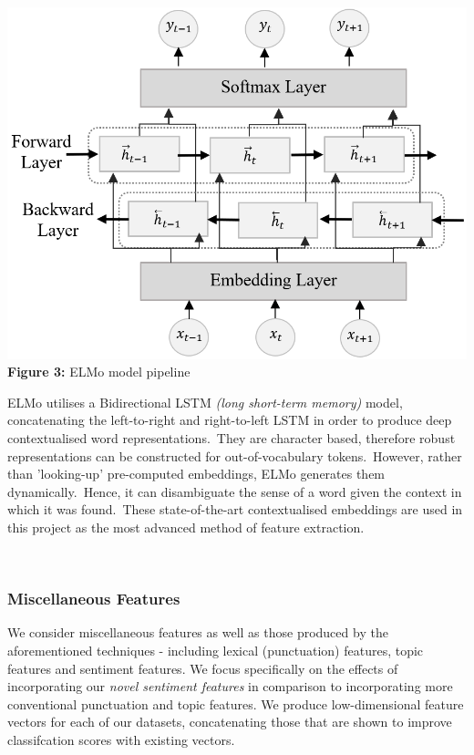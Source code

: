 \documentclass[12pt,a4paper]{article}
\begin{document}
\begin{minipage}{0.38\textwidth}
	 	\begin{center}
		\hspace{-1.5cm}\includegraphics[width=1.2\textwidth]{Images/elmo_diagram2.png}\\
		\hspace{-1cm}\textbf{Figure 3:} ELMo model pipeline\\
		\label{ELMo Model}
	\end{center}
\end{minipage} \hfill
\begin{minipage}{0.58\textwidth}
	  ELMo utilises a Bidirectional LSTM \textit{(long short-term memory)} model, concatenating the left-to-right and right-to-left LSTM in order to produce deep contextualised word representations.\ They are character based, therefore robust representations can be constructed for out-of-vocabulary tokens.\ However, rather than 'looking-up' pre-computed embeddings, ELMo generates them dynamically.\ Hence, it can disambiguate the sense of a word given the context in which it was found.\ These state-of-the-art contextualised embeddings are used in this project as the most advanced method of feature extraction.
\end{minipage}\\

\subsubsection{Miscellaneous Features}
We consider miscellaneous features as well as those produced by the aforementioned techniques - including lexical (punctuation) features, topic features and sentiment features. We focus specifically on the effects of incorporating our \textit{novel sentiment features} in comparison to incorporating more conventional punctuation and topic features. We produce low-dimensional feature vectors for each of our datasets, concatenating those that are shown to improve classifcation scores with existing vectors.\\\vspace{-5pt}
\end{document}
